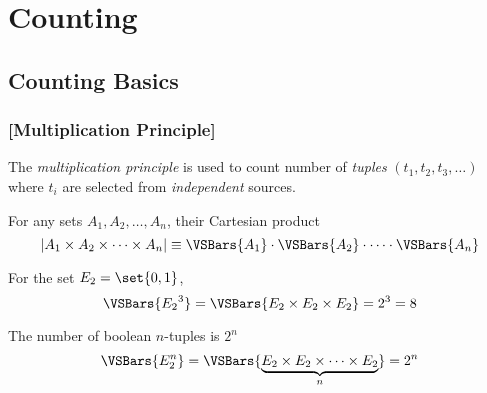\chapter{Counting}

\section{Counting Basics}

\subsection{[Multiplication Principle]}

\begin{definition}
    The \textit{multiplication principle} is used to count number of \textit{tuples} $(t_1, t_2, t_3, \dots)$ where $t_i$ are selected from \textit{independent} sources.
    
    For any sets $A_1, A_2, \dots, A_n$, their Cartesian product
    \begin{equation}
        \lvert A_1 \times A_2 \times \cdots \times A_n \rvert \equiv \VSBars{A_1} \cdot \VSBars{A_2} \cdot \cdots \cdot \VSBars{A_n}
    \end{equation}
\end{definition}

\begin{remark}
    For the set $E_2 = \set{0, 1}$,
    \begin{equation}
        \VSBars{{E_2}^3} = \VSBars{E_2 \times E_2 \times E_2} = 2^3 = 8
    \end{equation}
\end{remark}

\begin{remark}
    The number of boolean $n$-tuples is $2^n$
    \begin{equation}
        \VSBars{E_2^n} = \VSBars{ \underbrace{E_2 \times E_2 \times \cdots \times E_2}_{n} } = 2^n
    \end{equation}
\end{remark}

